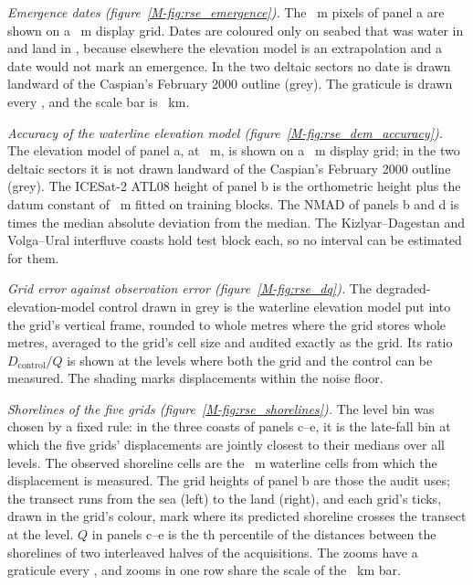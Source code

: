 \emph{Emergence dates (figure~\ref{M-fig:rse_emergence}).} The ~m pixels of panel a are shown on a ~m display grid. Dates are coloured only on seabed that was water in  and land in , because elsewhere the elevation model is an extrapolation and a date would not mark an emergence. In the two deltaic sectors no date is drawn landward of the Caspian's February 2000 outline (grey). The graticule is drawn every \textdegree{}, and the scale bar is ~km.

\emph{Accuracy of the waterline elevation model (figure~\ref{M-fig:rse_dem_accuracy}).} The elevation model of panel a, at ~m, is shown on a ~m display grid; in the two deltaic sectors it is not drawn landward of the Caspian's February 2000 outline (grey). The ICESat-2 ATL08 height of panel b is the orthometric height plus the datum constant of ~m fitted on training blocks. The NMAD of panels b and d is  times the median absolute deviation from the median. The Kizlyar--Dagestan and Volga--Ural interfluve coasts hold  test block each, so no interval can be estimated for them.

\emph{Grid error against observation error (figure~\ref{M-fig:rse_dq}).} The degraded-elevation-model control drawn in grey is the waterline elevation model put into the grid's vertical frame, rounded to whole metres where the grid stores whole metres, averaged to the grid's cell size and audited exactly as the grid. Its ratio $D_\mathrm{control}/Q$ is shown at the levels where both the grid and the control can be measured. The shading marks displacements within the noise floor.

\emph{Shorelines of the five grids (figure~\ref{M-fig:rse_shorelines}).} The level bin was chosen by a fixed rule: in the three coasts of panels c--e, it is the late-fall bin at which the five grids' displacements are jointly closest to their medians over all levels. The observed shoreline cells are the ~m waterline cells from which the displacement is measured. The grid heights of panel b are those the audit uses; the transect runs from the sea (left) to the land (right), and each grid's ticks, drawn in the grid's colour, mark where its predicted shoreline crosses the transect at the level. $Q$ in panels c--e is the th percentile of the distances between the shorelines of two interleaved halves of the acquisitions. The zooms have a graticule every \textdegree{}, and zooms in one row share the scale of the ~km bar.

